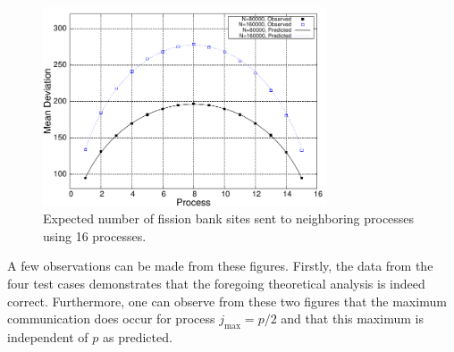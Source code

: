 \begin{figure}[ht!]
  \centering
  \includegraphics[width=0.75\textwidth]{figures/ch3/mean_deviance/plot16.pdf}
  \caption{Expected number of fission bank sites sent to neighboring processes
    using 16 processes.}
  \label{fig:mean-deviance16}
\end{figure}
A few observations can be made from these figures. Firstly, the data from the
four test cases demonstrates that the foregoing theoretical analysis is indeed
correct. Furthermore, one can observe from these two figures that the maximum
communication does occur for process $j_{\text{max}} = p/2$ and that this
maximum is independent of $p$ as predicted.

